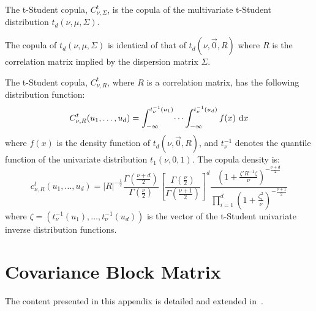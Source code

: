 \documentclass[11pt,fleqn]{book} %
\begin{document}
\begin{definition}
	The t-Student copula, $C_{\nu,\Sigma}^t$, is the copula of the multivariate 
	t-Student distribution $t_d(\nu,\mu,\Sigma)$.
\end{definition}

\begin{proposition}
	The copula of $t_d(\nu,\mu,\Sigma)$ is identical of that of $t_d(\nu,\vec{0},R)$
	where $R$ is the correlation matrix implied by the dispersion matrix $\Sigma$.
\end{proposition}

\begin{proposition}
	The t-Student copula, $C_{\nu,R}^t$, where $R$ is a correlation matrix,
	has the following distribution function:
	\begin{displaymath}
		C_{\nu,R}^t(u_1, \dots, u_d) = 
		\int_{-\infty}^{t_\nu^{-1}(u_1)} \dots \int_{-\infty}^{t_\nu^{-1}(u_d)} f(x) \mathop{\,\mathrm{{}d}}\mathopen{} x
	\end{displaymath}
	where $f(x)$ is the density function of $t_d(\nu,\vec{0},R)$, and $t_{\nu}^{-1}$ 
	denotes the quantile function of the univariate distribution $t_1(\nu,0,1)$. 
	The copula density is:
	\begin{displaymath}
		\label{eq:density}
		c_{\nu,R}^t(u_1,\dots,u_d) =
		|R|^{-\frac{1}{2}} 
		\displaystyle\frac{\Gamma{\left(\frac{\nu+d}{2}\right)}}{\Gamma{\left(\frac{\nu}{2}\right)}}
		\displaystyle\left[ \frac{\Gamma{\left(\frac{\nu}{2}\right)}}{\Gamma{\left(\frac{\nu+1}{2}\right)}} \right]^d
		\frac{\displaystyle\left( 1+\frac{\zeta' R^{-1} \zeta}{\nu}\right)^{-\frac{\nu+d}{2}}}{\displaystyle\prod_{i=1}^d \left( 1+\frac{\zeta_i^2}{\nu} \right)^{-\frac{\nu+1}{2}}}
	\end{displaymath}
	\noindent
	where $\zeta=(t_\nu^{-1}(u_1), \dots, t_\nu^{-1}(u_d))$ is the vector of 
	the t-Student univariate inverse distribution functions.
\end{proposition}

\section{Covariance Block Matrix}
\label{ap:cbm}

The content presented in this appendix is detailed and extended 
in~\cite{torrent:2011}.
\end{document}
